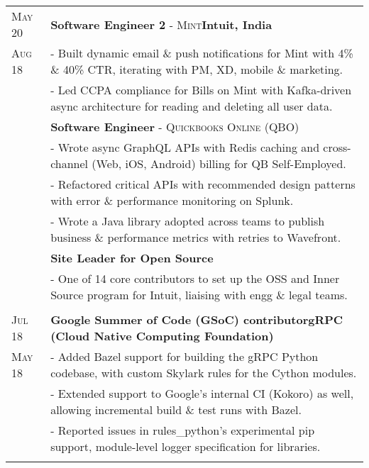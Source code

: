 \documentclass[a4paper,10pt]{extarticle} %
\begin{document}
\begin{tabularx}{\linewidth}{ l | X }
\textsc{May 20} & \textbf{Software Engineer 2} \textsc{- Mint}\hfill\textbf{Intuit, India}\\
\textsc{Aug 18} & {- Built dynamic email \& push notifications for Mint with 4\% \& 40\% CTR, iterating with PM, XD, mobile \& marketing.}\\
& {- Led CCPA compliance for Bills on Mint with Kafka-driven async architecture for reading and deleting all user data.}\\
& \textbf{Software Engineer} \textsc{- Quickbooks Online (QBO)}\\
& {- Wrote async GraphQL APIs with Redis caching and cross-channel (Web, iOS, Android) billing for QB Self-Employed.}\\
& {- Refactored critical APIs with recommended design patterns with error \& performance monitoring on Splunk.}\\
& {- Wrote a Java library adopted across teams to publish business \& performance metrics with retries to Wavefront.}\\
& \textbf{Site Leader for Open Source}\\
& {- One of 14 core contributors to set up the OSS and Inner Source program for Intuit, liaising with engg \& legal teams.}\\
\multicolumn{2}{c}{} \\

\textsc{Jul 18} & \textbf{Google Summer of Code (GSoC) contributor}\hfill\textbf{gRPC (Cloud Native Computing Foundation)}\\
\textsc{May 18}& {- Added Bazel support for building the gRPC Python codebase, with custom Skylark rules for the Cython modules.}\\
& {- Extended support to Google's internal CI (Kokoro) as well, allowing incremental build \& test runs with Bazel.}\\
& {- Reported issues in rules\_python's experimental pip support, module-level logger specification for libraries.}\\
\multicolumn{2}{c}{} \\



\end{tabularx}
\end{document}
